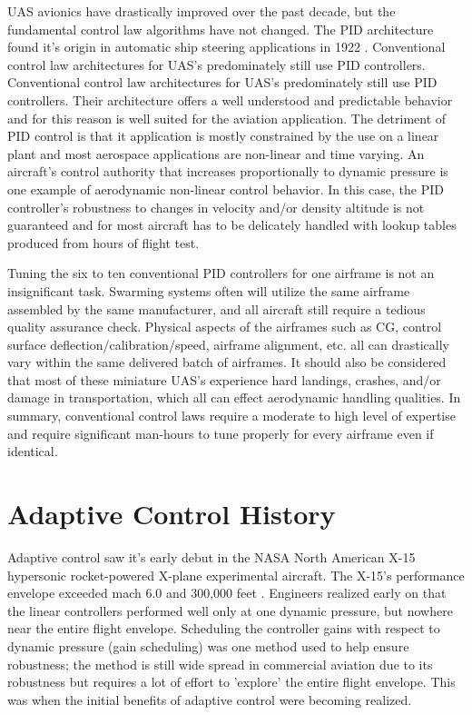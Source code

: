 \ac{UAS} avionics have drastically improved over the past decade, but the fundamental control law algorithms have not changed.  The \ac{PID} architecture found it's origin in automatic ship steering applications in 1922 \cite{minorsky1922pid}.  Conventional control law architectures for \ac{UAS}'s predominately still use \ac{PID} controllers.  Conventional control law architectures for \ac{UAS}'s predominately still use \ac{PID} controllers.  Their architecture offers a well understood and predictable behavior and for this reason is well suited for the aviation application.  The detriment of \ac{PID} control is that it application is mostly constrained by the use on a linear plant and most aerospace applications are non-linear and time varying.   An aircraft's control authority that increases proportionally to dynamic pressure is one example of aerodynamic non-linear control behavior.  In this case, the \ac{PID} controller's robustness to changes in velocity and/or density altitude is not guaranteed and for most aircraft has to be delicately handled with lookup tables produced from hours of flight test.

Tuning the six to ten conventional \ac{PID} controllers for one airframe is not an insignificant task.  Swarming systems often will utilize the same airframe assembled by the same manufacturer, and all aircraft still require a tedious quality assurance check.  Physical aspects of the airframes such as \ac{CG}, control surface deflection/calibration/speed, airframe alignment, etc. all can drastically vary within the same delivered batch of airframes.  It should also be considered that most of these miniature \ac{UAS}'s experience hard landings, crashes, and/or damage in transportation, which all can effect aerodynamic handling qualities.  In summary, conventional control laws require a moderate to high level of expertise and require significant man-hours to tune properly for every airframe even if identical.  


\section{Adaptive Control History}\label{history}
Adaptive control saw it's early debut in the NASA North American X-15 hypersonic rocket-powered X-plane experimental aircraft.  The X-15's performance envelope exceeded mach 6.0 and 300,000 feet \cite{jenkins2000x15specs}.  Engineers realized early on that the linear controllers performed well only at one dynamic pressure, but nowhere near the entire flight envelope.  Scheduling the controller gains with respect to dynamic pressure (gain scheduling) was one method used to help ensure robustness;  the method is still wide spread in commercial aviation due to its robustness but requires a lot of effort to 'explore' the entire flight envelope.  This was when the initial benefits of adaptive control were becoming realized.

